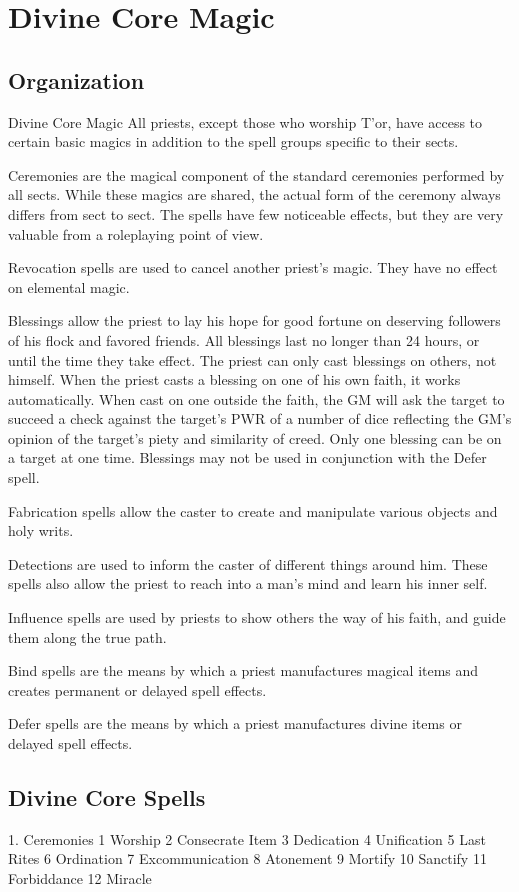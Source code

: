 \chapter{Divine Core Magic}
\label{ch:divine-core-magic}
\section{Organization}
Divine Core Magic
All priests, except those who worship T’or, have access to certain basic magics in addition to the spell groups specific to their sects.

Ceremonies are the magical component of the standard ceremonies performed by all sects. While these magics are shared, the actual form of the ceremony always differs from sect to sect. The spells have few noticeable effects, but they are very valuable from a roleplaying point of view.

Revocation spells are used to cancel another priest’s magic. They have no effect on elemental magic.

Blessings allow the priest to lay his hope for good fortune on deserving followers of his flock and favored friends. All blessings last no longer than 24 hours, or until the time they take effect. The priest can only cast blessings on others, not himself. When the priest casts a blessing on one of his own faith, it works automatically. When cast on one outside the faith, the GM will ask the target to succeed a check against the target’s PWR of a number of dice reflecting the GM’s opinion of the target’s piety and similarity of creed. Only one blessing can be on a target at one time. Blessings may not be used in conjunction with the Defer spell.

Fabrication spells allow the caster to create and manipulate various objects and holy writs.

Detections are used to inform the caster of different things around him. These spells also allow the priest to reach into a man’s mind and learn his inner self.

Influence spells are used by priests to show others the way of his faith, and guide them along the true path.

Bind spells are the means by which a priest manufactures magical items and creates permanent or delayed spell effects.

Defer spells are the means by which a priest manufactures divine items or delayed spell effects.

\section{Divine Core Spells}
1. Ceremonies
1 Worship
2 Consecrate Item
3 Dedication
4 Unification
5 Last Rites
6 Ordination
7 Excommunication
8 Atonement
9 Mortify
10 Sanctify
11 Forbiddance
12 Miracle

